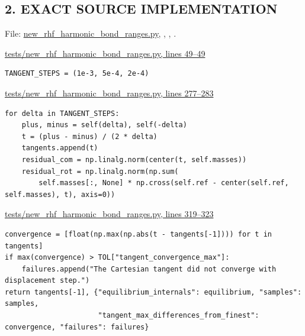 \documentclass[10pt,a4paper]{article}
\begin{document}
\subsection{2. EXACT SOURCE IMPLEMENTATION}
File: \href{/Users/novaz/Desktop/qml2.0/tests/new\_rhf\_harmonic\_bond\_ranges.py:272}{new\_rhf\_harmonic\_bond\_ranges.py}, , , .

\href{/Users/novaz/Desktop/qml2.0/tests/new\_rhf\_harmonic\_bond\_ranges.py:49}{tests/new\_rhf\_harmonic\_bond\_ranges.py, lines 49–49}

\begin{Verbatim}
TANGENT_STEPS = (1e-3, 5e-4, 2e-4)
\end{Verbatim}
\href{/Users/novaz/Desktop/qml2.0/tests/new\_rhf\_harmonic\_bond\_ranges.py:277}{tests/new\_rhf\_harmonic\_bond\_ranges.py, lines 277–283}

\begin{Verbatim}
for delta in TANGENT_STEPS:
    plus, minus = self(delta), self(-delta)
    t = (plus - minus) / (2 * delta)
    tangents.append(t)
    residual_com = np.linalg.norm(center(t, self.masses))
    residual_rot = np.linalg.norm(np.sum(
        self.masses[:, None] * np.cross(self.ref - center(self.ref, self.masses), t), axis=0))
\end{Verbatim}
\href{/Users/novaz/Desktop/qml2.0/tests/new\_rhf\_harmonic\_bond\_ranges.py:319}{tests/new\_rhf\_harmonic\_bond\_ranges.py, lines 319–323}

\begin{Verbatim}
convergence = [float(np.max(np.abs(t - tangents[-1]))) for t in tangents]
if max(convergence) > TOL["tangent_convergence_max"]:
    failures.append("The Cartesian tangent did not converge with displacement step.")
return tangents[-1], {"equilibrium_internals": equilibrium, "samples": samples,
                      "tangent_max_differences_from_finest": convergence, "failures": failures}
\end{Verbatim}
\end{document}
